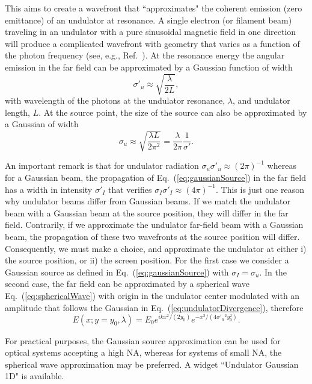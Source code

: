 \documentclass{iopconfser}
\begin{document}
This aims to create a wavefront that ``approximates" the coherent emission (zero emittance) of an undulator at resonance.
A single electron (or filament beam) traveling in an undulator with a pure sinusoidal magnetic field in one direction will produce a complicated wavefront with geometry that varies as a function of the photon frequency (see, e.g., Ref.~\cite{elleaume}). At the resonance energy the angular emission in the far field can be approximated by a Gaussian function of width \cite{elleaume}
\begin{equation}
\label{eq:undulatorDivergence}
    \sigma'_u \approx\sqrt{\frac{\lambda}{2 L}},
\end{equation}
with wavelength of the photons at the undulator resonance, $\lambda$, and undulator length, $L$. At the source point, the size of the source can also be approximated by a Gaussian of width
\begin{equation}
\label{eq:undulatorSize}
    \sigma_u \approx\sqrt{\frac{\lambda L}{2 \pi^2}} = \frac{\lambda}{2 \pi} \frac{1}{\sigma'}.
\end{equation}

An important remark is that for undulator radiation $\sigma_u \sigma'_{u} \approx (2\pi)^{-1}$ whereas for a Gaussian beam, the propagation of Eq.~(\ref{eq:gaussianSource}) in the far field has a width in intensity $\sigma'_{I}$ that verifies $\sigma_I \sigma'_{I} \approx (4\pi)^{-1}$. This is just one reason why undulator beams differ from Gaussian beams. If we match the undulator beam with a Gaussian beam at the source position, they will differ in the far field. Contrarily, if we approximate the undulator far-field beam with a Gaussian beam, the propagation of these two wavefronts at the source position will differ. 
Consequently, we must make a choice, and approximate the undulator at either i) the source position, or ii) the screen position. 
For the first case we consider a  Gaussian source as defined in Eq.~(\ref{eq:gaussianSource}) with $\sigma_I=\sigma_u$.
In the second case, the far field can be approximated by a spherical wave Eq.~(\ref{eq:sphericalWave}) with origin in the undulator center modulated with an amplitude that follows the Gaussian in Eq.~(\ref{eq:undulatorDivergence}), therefore
\begin{equation}  \label{eq:undulatorBySphericalWave}
    E(x;y=y_0,\lambda) = E_0 e^{i k x^2 / (2 y_0)} e^{-x^2/(4 \sigma'_u{}^2 y_0^2)}.
\end{equation}

For practical purposes, the Gaussian source approximation can be used for optical systems accepting a high NA, whereas for systems of small NA, the spherical wave approximation may be preferred. A widget ``Undulator Gaussian 1D" is available.
\end{document}
